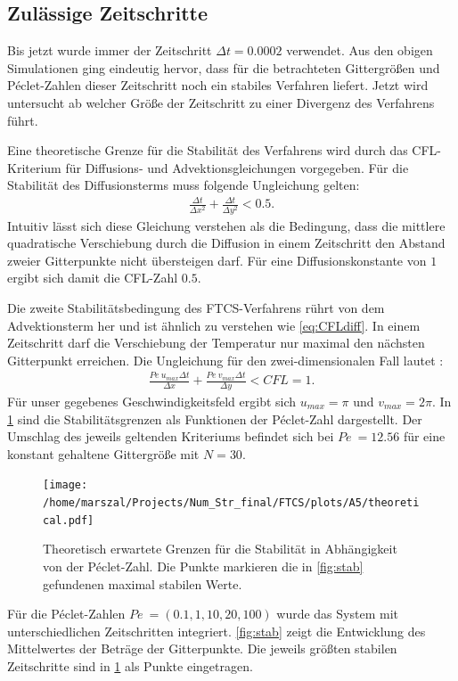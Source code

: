 \subsection{Zulässige Zeitschritte}
Bis jetzt wurde immer der Zeitschritt $\Delta t=0.0002$ verwendet. Aus den obigen Simulationen ging eindeutig hervor, dass für die betrachteten Gittergrößen und Péclet-Zahlen dieser Zeitschritt noch ein stabiles Verfahren liefert.
Jetzt wird untersucht ab welcher Größe der Zeitschritt zu einer Divergenz des Verfahrens führt.

Eine theoretische Grenze für die Stabilität des Verfahrens wird durch das CFL-Kriterium für Diffusions- und Advektionsgleichungen vorgegeben.
Für die Stabilität des Diffusionsterms muss folgende Ungleichung gelten:
\begin{align}
  \frac{\Delta t}{\Delta x^2}+\frac{\Delta t}{\Delta y^2} < 0.5. \label{eq:CFLdiff}
\end{align}
Intuitiv lässt sich diese Gleichung verstehen als die Bedingung, dass die mittlere quadratische Verschiebung durch die Diffusion in einem Zeitschritt den Abstand zweier Gitterpunkte nicht übersteigen darf. Für eine Diffusionskonstante von $1$ ergibt sich damit die CFL-Zahl $0.5$.

Die zweite Stabilitätsbedingung des FTCS-Verfahrens rührt von dem Advektionsterm her und ist ähnlich zu verstehen wie \cref{eq:CFLdiff}. In einem Zeitschritt darf die Verschiebung der Temperatur nur maximal den nächsten Gitterpunkt erreichen.
Die Ungleichung für den zwei-dimensionalen Fall lautet \cite{CFL}:
\begin{align}
  \frac{Pe~u_{max} \Delta t}{\Delta x} +\frac{Pe~v_{max} \Delta t}{\Delta y}  < CFL = 1. \label{eq:CFLAdv}
\end{align}
Für unser gegebenes Geschwindigkeitsfeld ergibt sich $u_{max} = \pi$ und $v_{max} = 2\pi$. In \cref{fig:CFL} sind die Stabilitätsgrenzen als Funktionen der Péclet-Zahl dargestellt. Der Umschlag des jeweils geltenden Kriteriums befindet sich bei $Pe~=12.56$ für eine konstant gehaltene Gittergröße mit $N=30$.
\begin{figure}
  \centering
  \texttt{[image: /home/marszal/Projects/Num\_Str\_final/FTCS/plots/A5/theoretical.pdf]}
  \caption{Theoretisch erwartete Grenzen für die Stabilität in Abhängigkeit von der Péclet-Zahl. Die Punkte markieren die in \cref{fig:stab} gefundenen maximal stabilen Werte.}\label{fig:CFL}
\end{figure}

Für die Péclet-Zahlen $Pe~=(0.1,1,10,20,100)$ wurde das System mit unterschiedlichen Zeitschritten integriert. \cref{fig:stab} zeigt die Entwicklung des Mittelwertes der Beträge der Gitterpunkte. Die jeweils größten stabilen Zeitschritte sind in \cref{fig:CFL} als Punkte eingetragen.


